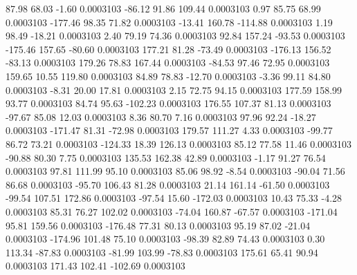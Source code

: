        87.98       68.03       -1.60     0.0003103
      -86.12       91.86      109.44     0.0003103
        0.97       85.75       68.99     0.0003103
     -177.46       98.35       71.82     0.0003103
      -13.41      160.78     -114.88     0.0003103
        1.19       98.49      -18.21     0.0003103
        2.40       79.19       74.36     0.0003103
       92.84      157.24      -93.53     0.0003103
     -175.46      157.65      -80.60     0.0003103
      177.21       81.28      -73.49     0.0003103
     -176.13      156.52      -83.13     0.0003103
      179.26       78.83      167.44     0.0003103
      -84.53       97.46       72.95     0.0003103
      159.65       10.55      119.80     0.0003103
       84.89       78.83      -12.70     0.0003103
       -3.36       99.11       84.80     0.0003103
       -8.31       20.00       17.81     0.0003103
        2.15       72.75       94.15     0.0003103
      177.59      158.99       93.77     0.0003103
       84.74       95.63     -102.23     0.0003103
      176.55      107.37       81.13     0.0003103
      -97.67       85.08       12.03     0.0003103
        8.36       80.70        7.16     0.0003103
       97.96       92.24      -18.27     0.0003103
     -171.47       81.31      -72.98     0.0003103
      179.57      111.27        4.33     0.0003103
      -99.77       86.72       73.21     0.0003103
     -124.33       18.39      126.13     0.0003103
       85.12       77.58       11.46     0.0003103
      -90.88       80.30        7.75     0.0003103
      135.53      162.38       42.89     0.0003103
       -1.17       91.27       76.54     0.0003103
       97.81      111.99       95.10     0.0003103
       85.06       98.92       -8.54     0.0003103
      -90.04       71.56       86.68     0.0003103
      -95.70      106.43       81.28     0.0003103
       21.14      161.14      -61.50     0.0003103
      -99.54      107.51      172.86     0.0003103
      -97.54       15.60     -172.03     0.0003103
       10.43       75.33       -4.28     0.0003103
       85.31       76.27      102.02     0.0003103
      -74.04      160.87      -67.57     0.0003103
     -171.04       95.81      159.56     0.0003103
     -176.48       77.31       80.13     0.0003103
       95.19       87.02      -21.04     0.0003103
     -174.96      101.48       75.10     0.0003103
      -98.39       82.89       74.43     0.0003103
        0.30      113.34      -87.83     0.0003103
      -81.99      103.99      -78.83     0.0003103
      175.61       65.41       90.94     0.0003103
      171.43      102.41     -102.69     0.0003103
